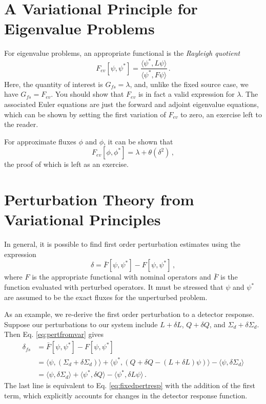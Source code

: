 \section*{A Variational Principle for Eigenvalue Problems}

For eigenvalue problems, an appropriate functional is the \textit{Rayleigh quotient}
\begin{equation}
 F_{ev}[\psi,\psi^*] = \frac{\langle \psi^*,L\psi \rangle}{ \langle \psi^*, F \psi \rangle } \, .
 \label{eq:rayleigh}
\end{equation}
Here, the quantity of interest is $G_{fs} = \lambda$, and, unlike the fixed source case, we have $G_{fs} = F_{ev}$.  You should show that $F_{ev}$ is in fact a valid expression for $\lambda$.  The associated Euler equations are just the forward and adjoint eigenvalue equations, which can be shown by setting the first variation of $F_{ev}$ to zero, an exercise left to the reader.

For approximate fluxes $\phi$ and $\phi$, it can be shown that
\begin{equation}
 F_{ev}[\phi,\phi^*] = \lambda + \theta(\delta^2) \, ,
\end{equation}
the proof of which is left as an exercise.

\section*{Perturbation Theory from Variational Principles}

In general, it is possible to find first order perturbation estimates using the expression
\begin{equation}
 \delta = \bar{F}[\psi,\psi^*] - F[\psi,\psi^*] \, ,
 \label{eq:pertfromvar}
\end{equation}
where $F$ is the appropriate functional with nominal operators and $\bar{F}$ is the function evaluated with perturbed operators.  It must be stressed that $\psi$ and $\psi^*$ are assumed to be the exact fluxes for the unperturbed problem.

As an example, we re-derive the first order perturbation to a detector response.  Suppose our perturbations to our system include $L+\delta L$, $Q+\delta Q$, and $\Sigma_d + \delta \Sigma_d$.  Then Eq. \ref{eq:pertfromvar}  gives
\begin{equation}
\begin{split}
 \delta_{fs} &= \bar{F}[\psi,\psi^*] - F[\psi,\psi^*] \\
        &= \langle \psi, (\Sigma_d+\delta \Sigma_d) \rangle + \langle \psi^*,(Q+\delta Q-(L+\delta L)\psi ) \rangle - \langle \psi, \delta \Sigma_d \rangle \\
        &= \langle \psi,\delta \Sigma_d \rangle + \langle \psi^* , \delta Q \rangle - \langle \psi^*,\delta L \psi \rangle \, .
\end{split}
\label{eq:fixedpertvar}
\end{equation}
The last line is equivalent to Eq. \ref{eq:fixedpertresp} with the addition of the first term, which explicitly accounts for changes in the detector response function.

